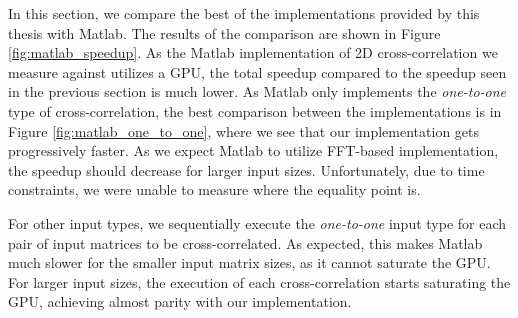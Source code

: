 In this section, we compare the best of the implementations provided by this thesis with Matlab. The results of the comparison are shown in Figure \ref{fig:matlab_speedup}. As the Matlab implementation of 2D cross-correlation we measure against utilizes a GPU, the total speedup compared to the speedup seen in the previous section is much lower. As Matlab only implements the \textit{one-to-one} type of cross-correlation, the best comparison between the implementations is in Figure \ref{fig:matlab_one_to_one}, where we see that our implementation gets progressively faster. As we expect Matlab to utilize FFT-based implementation, the speedup should decrease for larger input sizes. Unfortunately, due to time constraints, we were unable to measure where the equality point is.

For other input types, we sequentially execute the \textit{one-to-one} input type for each pair of input matrices to be cross-correlated. As expected, this makes Matlab much slower for the smaller input matrix sizes, as it cannot saturate the GPU. For larger input sizes, the execution of each cross-correlation starts saturating the GPU, achieving almost parity with our implementation.